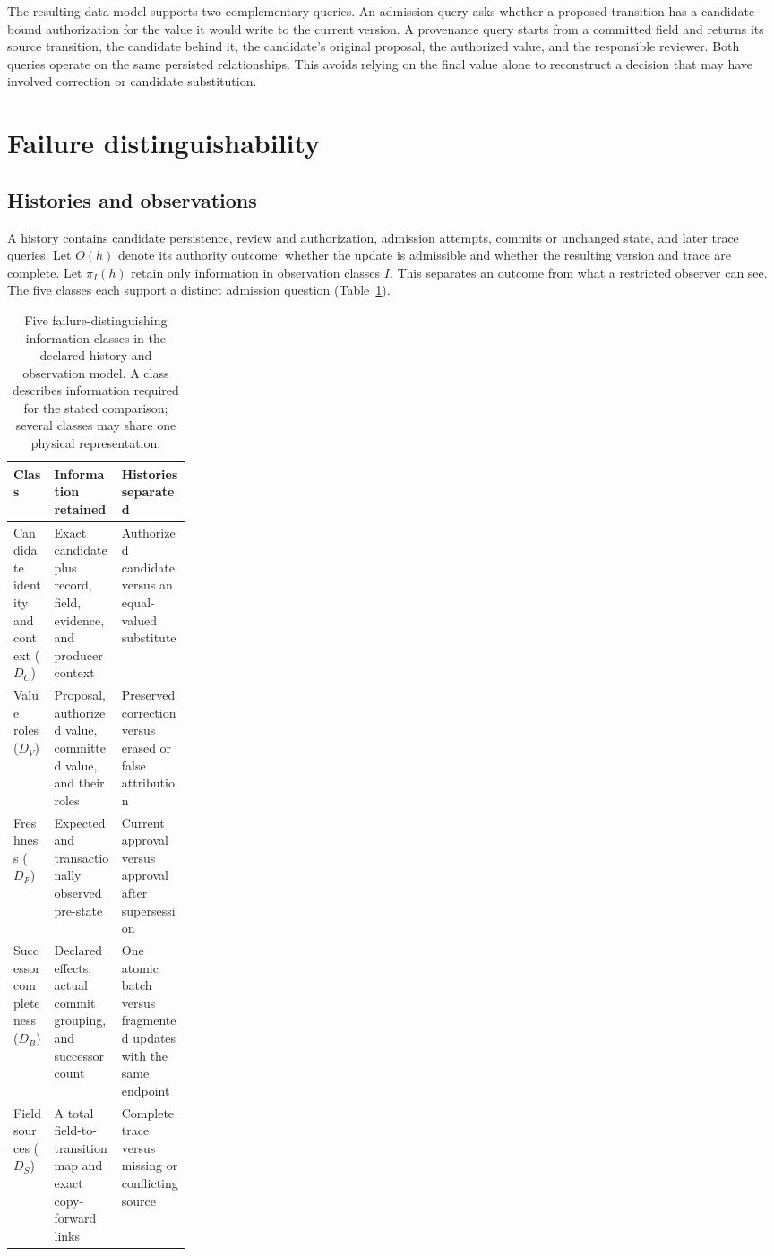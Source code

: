 \documentclass[preprint,12pt,authoryear]{elsarticle}
\begin{document}
The resulting data model supports two complementary queries. An admission query asks whether a proposed transition has a candidate-bound authorization for the value it would write to the current version. A provenance query starts from a committed field and returns its source transition, the candidate behind it, the candidate's original proposal, the authorized value, and the responsible reviewer. Both queries operate on the same persisted relationships. This avoids relying on the final value alone to reconstruct a decision that may have involved correction or candidate substitution.

\section{Failure distinguishability}

\subsection{Histories and observations}

A history contains candidate persistence, review and authorization, admission attempts, commits or unchanged state, and later trace queries. Let $O(h)$ denote its authority outcome: whether the update is admissible and whether the resulting version and trace are complete. Let $\pi_I(h)$ retain only information in observation classes $I$. This separates an outcome from what a restricted observer can see. The five classes each support a distinct admission question (Table~\ref{tab:1}).

\begin{table}[tbp]
\caption{Five failure-distinguishing information classes in the declared history and observation model. A class describes information required for the stated comparison; several classes may share one physical representation.}
\label{tab:1}
\centering
\footnotesize
\begin{tabularx}{\linewidth}{@{}>{\raggedright\arraybackslash}p{0.23\linewidth}>{\raggedright\arraybackslash}X>{\raggedright\arraybackslash}X@{}}
\toprule
Class & Information retained & Histories separated \\
\midrule
Candidate identity and context ($D_C$) & Exact candidate plus record, field, evidence, and producer context & Authorized candidate versus an equal-valued substitute \\
Value roles ($D_V$) & Proposal, authorized value, committed value, and their roles & Preserved correction versus erased or false attribution \\
Freshness ($D_F$) & Expected and transactionally observed pre-state & Current approval versus approval after supersession \\
Successor completeness ($D_B$) & Declared effects, actual commit grouping, and successor count & One atomic batch versus fragmented updates with the same endpoint \\
Field sources ($D_S$) & A total field-to-transition map and exact copy-forward links & Complete trace versus missing or conflicting source \\
\bottomrule
\end{tabularx}
\end{table}
\end{document}
